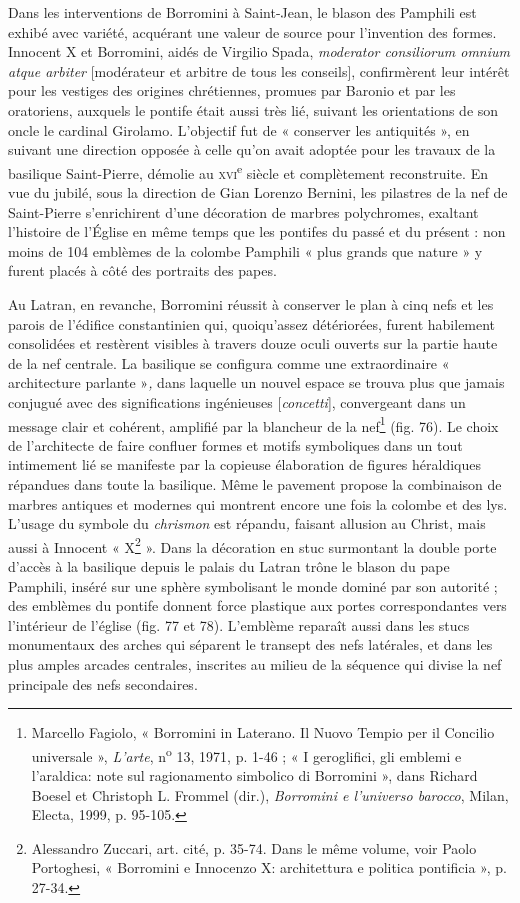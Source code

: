 \documentclass[12pt,twoside,openany]{book}
\begin{document}
Dans les interventions de Borromini à Saint-Jean, le blason des Pamphili est exhibé avec variété, acquérant une valeur de source pour l’invention des formes. Innocent X et Borromini, aidés de Virgilio Spada, \textit{moderator consiliorum omnium atque arbiter} [modérateur et arbitre de tous les conseils], confirmèrent leur intérêt pour les vestiges des origines chrétiennes, promues par Baronio et par les oratoriens, auxquels le pontife était aussi très lié, suivant les orientations de son oncle le cardinal Girolamo. L’objectif fut de « conserver les antiquités », en suivant une direction opposée à celle qu’on avait adoptée pour les travaux de la basilique Saint-Pierre, démolie au \textsc{xvi}\textsuperscript{e} siècle et complètement reconstruite. En vue du jubilé, sous la direction de Gian Lorenzo Bernini, les pilastres de la nef de Saint-Pierre s’enrichirent d’une décoration de marbres polychromes, exaltant l’histoire de l’Église en même temps que les pontifes du passé et du présent : non moins de 104 emblèmes de la colombe Pamphili « plus grands que nature » y furent placés à côté des portraits des papes.

Au Latran, en revanche, Borromini réussit à conserver le plan à cinq nefs et les parois de l’édifice constantinien qui, quoiqu’assez détériorées, furent habilement consolidées et restèrent visibles à travers douze oculi ouverts sur la partie haute de la nef centrale. La basilique se configura comme une extraordinaire « architecture parlante »\textit{,} dans laquelle un nouvel espace se trouva plus que jamais conjugué avec des significations ingénieuses [\textit{concetti}], convergeant dans un message clair et cohérent, amplifié par la blancheur de la nef\footnote{Marcello Fagiolo, « Borromini in Laterano. Il Nuovo Tempio per il Concilio universale », \textit{L’arte}, n\textsuperscript{o} 13, 1971, p. 1-46 ; « I geroglifici, gli emblemi e l’araldica: note sul ragionamento simbolico di Borromini », dans Richard Boesel et Christoph L. Frommel (dir.), \textit{Borromini e l’universo barocco}, Milan, Electa, 1999, p. 95-105.} (fig. 76). Le choix de l’architecte de faire confluer formes et motifs symboliques dans un tout intimement lié se manifeste par la copieuse élaboration de figures héraldiques répandues dans toute la basilique. Même le pavement propose la combinaison de marbres antiques et modernes qui montrent encore une fois la colombe et des lys. L’usage du symbole du \textit{chrismon }est répandu\textit{, }faisant allusion au Christ, mais aussi à Innocent « X\footnote{Alessandro Zuccari, art. cité, p. 35-74. Dans le même volume, voir Paolo Portoghesi, « Borromini e Innocenzo X: architettura e politica pontificia », p. 27-34.} ». Dans la décoration en stuc surmontant la double porte d’accès à la basilique depuis le palais du Latran trône le blason du pape Pamphili, inséré sur une sphère symbolisant le monde dominé par son autorité ; des emblèmes du pontife donnent force plastique aux portes correspondantes vers l’intérieur de l’église (fig. 77 et 78). L’emblème reparaît aussi dans les stucs monumentaux des arches qui séparent le transept des nefs latérales, et dans les plus amples arcades centrales, inscrites au milieu de la séquence qui divise la nef principale des nefs secondaires.
\end{document}
